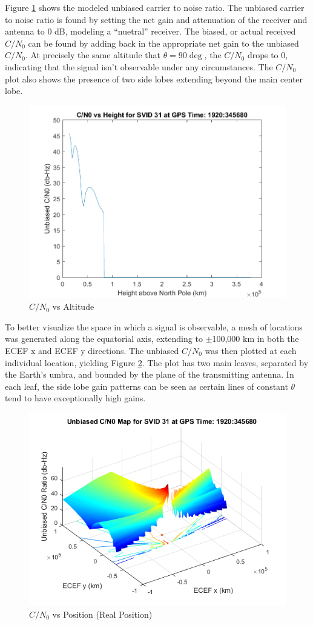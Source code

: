 \documentclass[11pt]{article}
\newcommand{\cnr}{C/N_0}
\begin{document}
Figure \ref{fig:cnonorthpole} shows the modeled unbiased carrier to noise ratio. The unbiased carrier to noise ratio is found by setting the net gain and attenuation of the receiver and antenna to 0 dB, modeling a ``nuetral'' receiver. The biased, or actual received $\cnr$ can be found by adding back in the appropriate net gain to the unbiased $\cnr$. At precisely the same altitude that $\theta = 90\deg$, the $\cnr$ drops to 0, indicating that the signal isn't observable under any circumstances. The $\cnr$ plot also shows the presence of two side lobes extending beyond the main center lobe.

\begin{figure}[h]
\centering
\includegraphics[width=.75\textwidth]{../Images/cn0vsheight.png}
\caption{$\cnr$ vs Altitude}
\label{fig:cnonorthpole}
\end{figure}

To better visualize the space in which a signal is observable, a mesh of locations was generated along the equatorial axis, extending to $\pm$100,000 km in both the ECEF x and ECEF y directions. The unbiased $\cnr$ was then plotted at each individual location, yielding Figure \ref{fig:cn0actual}. The plot has two main leaves, separated by the Earth's umbra, and bounded by the plane of the transmitting antenna. In each leaf, the side lobe gain patterns can be seen as certain lines of constant $\theta$ tend to have exceptionally high gains.

\begin{figure}[h]
\centering
\includegraphics[width=.75\textwidth]{../Images/cn0mapactual.png}
\caption{$\cnr$ vs Position (Real Position)}
\label{fig:cn0actual}
\end{figure}
\end{document}
